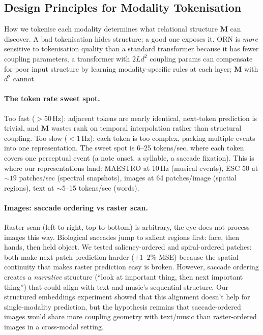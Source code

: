 \documentclass[11pt, a4paper]{article}
\newcommand{\M}{\mathbf{M}}
\theoremstyle{plain}
\theoremstyle{remark}
\begin{document}
\subsection{Design Principles for Modality Tokenisation}\label{sec:tokenisation-design}

How we tokenise each modality determines what relational structure $\M$ can discover.
A bad tokenisation hides structure; a good one exposes it.
ORN is \emph{more} sensitive to tokenisation quality than a standard transformer because it has fewer coupling parameters, a transformer with $2Ld^2$ coupling params can compensate for poor input structure by learning modality-specific rules at each layer; $\M$ with $d^2$ cannot.

\paragraph{The token rate sweet spot.}
Too fast ($>50$\,Hz): adjacent tokens are nearly identical, next-token prediction is trivial, and $\M$ wastes rank on temporal interpolation rather than structural coupling.
Too slow ($<1$\,Hz): each token is too complex, packing multiple events into one representation.
The sweet spot is 6--25 tokens/sec, where each token covers one perceptual event (a note onset, a syllable, a saccade fixation).
This is where our representations land: MAESTRO at 10\,Hz (musical events), ESC-50 at ${\sim}19$ patches/sec (spectral snapshots), images at 64 patches/image (spatial regions), text at ${\sim}5$--15 tokens/sec (words).

\paragraph{Images: saccade ordering vs raster scan.}
Raster scan (left-to-right, top-to-bottom) is arbitrary, the eye does not process images this way.
Biological saccades jump to salient regions first: face, then hands, then held object.
We tested saliency-ordered and spiral-ordered patches: both make next-patch prediction harder ($+1$--$2\%$ MSE) because the spatial continuity that makes raster prediction easy is broken.
However, saccade ordering creates a \emph{narrative} structure (``look at important thing, then next important thing'') that could align with text and music's sequential structure.
Our structured embeddings experiment showed that this alignment doesn't help for single-modality prediction, but the hypothesis remains that saccade-ordered images would share more coupling geometry with text/music than raster-ordered images in a cross-modal setting.
\end{document}

